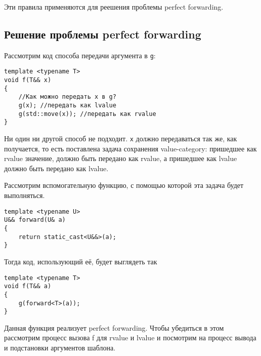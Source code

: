 \vspace{\baselineskip}

Эти правила применяются для реешения проблемы perfect forwarding.

\subsection{Решение проблемы perfect forwarding}

Рассмотрим код способа передачи аргумента в \texttt{g}:

\begin{verbatim}
template <typename T>
void f(T&& x)
{
	//Как можно передать x в g?
	g(x); //передать как lvalue
	g(std::move(x)); //передать как rvalue
}
\end{verbatim}

Ни один ни другой способ не подходит. \texttt{x} должно передаваться так же, как получается, то есть поставлена задача сохранения value-category: пришедшее как rvalue значение, должно быть передано как rvalue, а пришедшее как lvalue должно быть передано как lvalue.

Рассмотрим вспомогательную функцию, с помощью которой эта задача будет выполняться.

\begin{verbatim}
template <typename U>
U&& forward(U& a)
{
	return static_cast<U&&>(a);
}
\end{verbatim}

Тогда код, использующий её, будет выглядеть так

\begin{verbatim}
template <typename T>
void f(T&& a)
{
	g(forward<T>(a));
}
\end{verbatim}

Данная функция реализует perfect forwarding. Чтобы убедиться в этом рассмотрим процесс вызова f для rvalue и lvalue и посмотрим на процесс вывода и подстановки аргументов шаблона.

